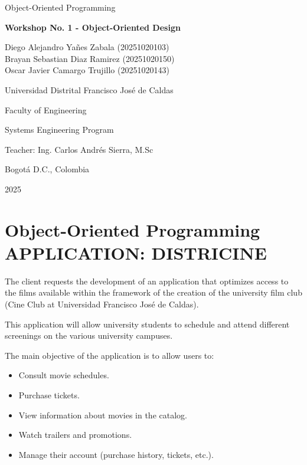 \documentclass[12pt, letterpaper]{article}
\begin{document}
\begin{titlepage}
    \centering
    \vspace*{1.5cm}
    {\Large Object-Oriented Programming \par}
    \vfill
    {\bfseries\LARGE Workshop No. 1 - Object-Oriented Design \par}
    \vfill
    {\large
        Diego Alejandro Yañes Zabala (20251020103) \\ 
        Brayan Sebastian Diaz Ramirez (20251020150) \\
        Oscar Javier Camargo Trujillo (20251020143) \par
    }
    \vfill
    {\Large Universidad Distrital Francisco José de Caldas \par}
    \vspace{1.5cm}
    {\large Faculty of Engineering \par}
    {\large Systems Engineering Program \par}
    {\large Teacher: Ing. Carlos Andrés Sierra, M.Sc \par}
    {\large Bogotá D.C., Colombia \par}
    {\large 2025 \par}
\end{titlepage}

\section*{Object-Oriented Programming APPLICATION: DISTRICINE}

The client requests the development of an application that optimizes access to the films available within the framework of the creation of the university film club (Cine Club at Universidad Francisco José de Caldas).

This application will allow university students to schedule and attend different screenings on the various university campuses.

The main objective of the application is to allow users to:
\begin{itemize}
    \item Consult movie schedules.
    \item Purchase tickets.
    \item View information about movies in the catalog.
    \item Watch trailers and promotions.
    \item Manage their account (purchase history, tickets, etc.).
\end{itemize}
\end{document}
